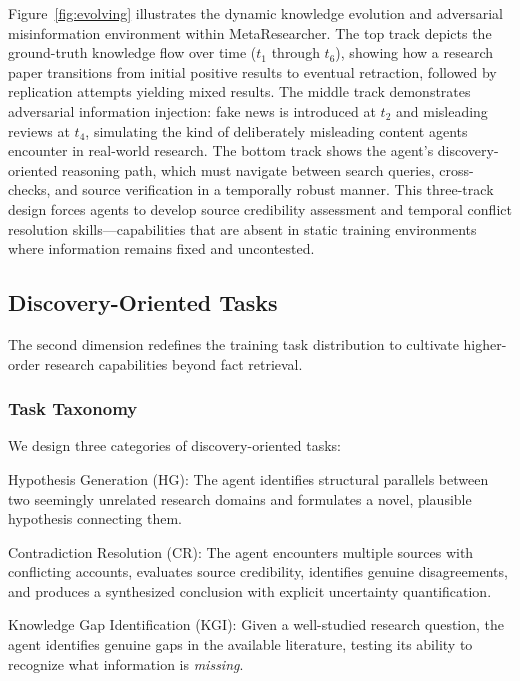 \documentclass[notspecified,article,accept,pdftex,moreauthors]{Definitions/mdpi}
\renewcommand{\textbf}[1]{#1}
\begin{document}
Figure~\ref{fig:evolving} illustrates the dynamic knowledge evolution and adversarial misinformation environment within MetaResearcher. The top track depicts the ground-truth knowledge flow over time ($t_1$ through $t_6$), showing how a research paper transitions from initial positive results to eventual retraction, followed by replication attempts yielding mixed results. The middle track demonstrates adversarial information injection: fake news is introduced at $t_2$ and misleading reviews at $t_4$, simulating the kind of deliberately misleading content agents encounter in real-world research. The bottom track shows the agent's discovery-oriented reasoning path, which must navigate between search queries, cross-checks, and source verification in a temporally robust manner. This three-track design forces agents to develop source credibility assessment and temporal conflict resolution skills---capabilities that are absent in static training environments where information remains fixed and uncontested.

\subsection{Discovery-Oriented Tasks}
\label{sec:discovery-tasks}
The second dimension redefines the training task distribution to cultivate higher-order research capabilities beyond fact retrieval.

\subsubsection{Task Taxonomy}
We design three categories of discovery-oriented tasks:

\textbf{Hypothesis Generation (HG):} The agent identifies structural parallels between two seemingly unrelated research domains and formulates a novel, plausible hypothesis connecting them.

\textbf{Contradiction Resolution (CR):} The agent encounters multiple sources with conflicting accounts, evaluates source credibility, identifies genuine disagreements, and produces a synthesized conclusion with explicit uncertainty quantification.

\textbf{Knowledge Gap Identification (KGI):} Given a well-studied research question, the agent identifies genuine gaps in the available literature, testing its ability to recognize what information is \textit{missing}.
\end{document}

